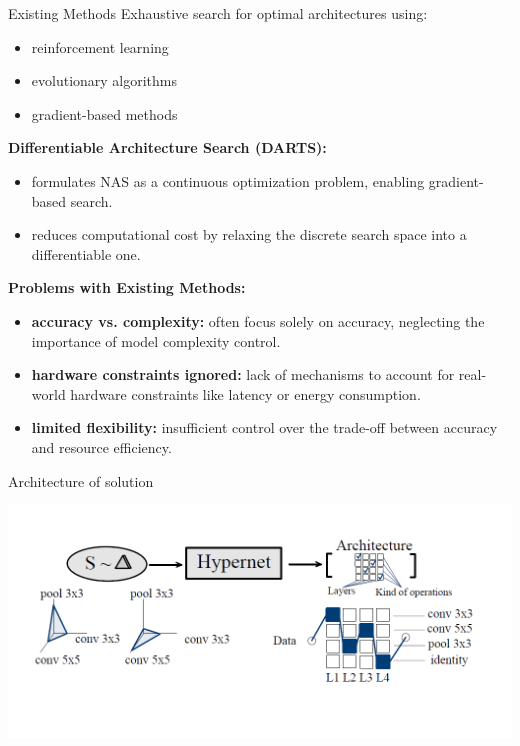 \documentclass{beamer}
\begin{document}
\begin{frame}{Existing Methods}
Exhaustive search for optimal architectures using: 
\begin{itemize}
        \item reinforcement learning
        \item evolutionary algorithms
        \item gradient-based methods
\end{itemize}

\textbf{Differentiable Architecture Search (DARTS):}
\begin{itemize}

        \item formulates NAS as a continuous optimization problem, enabling gradient-based search.
        \item reduces computational cost by relaxing the discrete search space into a differentiable one.

\end{itemize}

\textbf{Problems with Existing Methods:}
\begin{itemize}

        \item \textbf{accuracy vs. complexity:} often focus solely on accuracy, neglecting the importance of model complexity control.
        \item \textbf{hardware constraints ignored:} lack of mechanisms to account for real-world hardware constraints like latency or energy consumption.
        \item \textbf{limited flexibility:} insufficient control over the trade-off between accuracy and resource efficiency.

\end{itemize}
\end{frame}




\begin{frame}{Architecture of solution}

\includegraphics[width=1\linewidth]{picture.png}

\end{frame}
\end{document}
